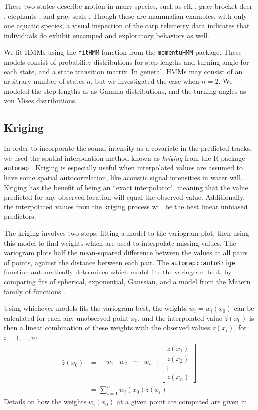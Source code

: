 \documentclass[12pt]{article}
\begin{document}
	These two states describe motion in many species, such as elk \cite{Morales2004, Fryxell2008}, gray brocket deer \cite{Grotta-Neto2019}, elephants \cite{Roever2014, Vogel2019}, and gray seals \cite{Breed2009}. Though these are mammalian examples, with only one aquatic species, a visual inspection of the carp telemetry data indicates that individuals do exhibit encamped and exploratory behaviors as well.
	
	We fit HMMs using the \texttt{fitHMM} function from the \texttt{momentuHMM} package. These models consist of probability distributions for step lengths and turning angle for each state, and a state transition matrix. In general, HMMs may consist of an arbitrary number of states $n$, but we investigated the case when $n = 2$. We modeled the step lengths as as Gamma distributions, and the turning angles as von Mises distributions.
	
	\subsection{Kriging}
	
	In order to incorporate the sound intensity as a covariate in the predicted tracks, we used the spatial interpolation method known as \emph{kriging} from the R package \texttt{automap} \cite{Hiemstra2008}. Kriging is especially useful when interpolated values are assumed to have some spatial autocorrelation, like acoustic signal intensities in water will. Kriging has the benefit of being an ``exact interpolator", meaning that the value predicted for any observed location will equal the observed value. Additionally, the interpolated values from the kriging process will be the best linear unbiased predictors.
	
	The kriging involves two steps: fitting a model to the variogram plot, then using this model to find weights which are used to interpolate missing values. The variogram plots half the mean-squared difference between the values at all pairs of points, against the distance between each pair. The \texttt{automap::autoKrige} function automatically determines which model fits the variogram best, by comparing fits of spherical, exponential, Gaussian, and a model from the Matern family of functions \cite{Hiemstra2008}. 
	
	Using whichever models fits the variogram best, the weights $w_i = w_i(x_0)$ can be calculated for each any unobserved point $x_0$, and the interpolated value $\hat z(x_0)$ is then a linear combination of these weights with the observed values $z(x_i)$, for $i = 1, \ldots, n$:
	\begin{align*}
		\hat z(x_0) &= \begin{bmatrix} w_1 & w_2 & \cdots & w_n \end{bmatrix} \begin{bmatrix} z(x_1) \\ z(x_2) \\ \vdots \\ z(x_n) \end{bmatrix} \\
		&= \sum_{i = 1}^n w_i(x_0) z(x_i)
	\end{align*}
	Details on how the weights $w_i(x_0)$ at a given point are computed are given in \cite{Bailey1995}.
	
\end{document}
